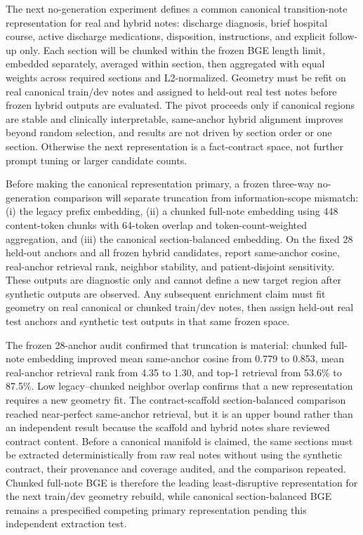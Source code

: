 \documentclass[11pt]{article}
\begin{document}
The next no-generation experiment defines a common canonical transition-note representation for real and hybrid notes: discharge diagnosis, brief hospital course, active discharge medications, disposition, instructions, and explicit follow-up only.  Each section will be chunked within the frozen BGE length limit, embedded separately, averaged within section, then aggregated with equal weights across required sections and L2-normalized.  Geometry must be refit on real canonical train/dev notes and assigned to held-out real test notes before frozen hybrid outputs are evaluated.  The pivot proceeds only if canonical regions are stable and clinically interpretable, same-anchor hybrid alignment improves beyond random selection, and results are not driven by section order or one section.  Otherwise the next representation is a fact-contract space, not further prompt tuning or larger candidate counts.

Before making the canonical representation primary, a frozen three-way no-generation comparison will separate truncation from information-scope mismatch: (i) the legacy prefix embedding, (ii) a chunked full-note embedding using 448 content-token chunks with 64-token overlap and token-count-weighted aggregation, and (iii) the canonical section-balanced embedding.  On the fixed 28 held-out anchors and all frozen hybrid candidates, report same-anchor cosine, real-anchor retrieval rank, neighbor stability, and patient-disjoint sensitivity.  These outputs are diagnostic only and cannot define a new target region after synthetic outputs are observed.  Any subsequent enrichment claim must fit geometry on real canonical or chunked train/dev notes, then assign held-out real test anchors and synthetic test outputs in that same frozen space.

The frozen 28-anchor audit confirmed that truncation is material: chunked full-note embedding improved mean same-anchor cosine from 0.779 to 0.853, mean real-anchor retrieval rank from 4.35 to 1.30, and top-1 retrieval from 53.6\% to 87.5\%.  Low legacy--chunked neighbor overlap confirms that a new representation requires a new geometry fit.  The contract-scaffold section-balanced comparison reached near-perfect same-anchor retrieval, but it is an upper bound rather than an independent result because the scaffold and hybrid notes share reviewed contract content.  Before a canonical manifold is claimed, the same sections must be extracted deterministically from raw real notes without using the synthetic contract, their provenance and coverage audited, and the comparison repeated.  Chunked full-note BGE is therefore the leading least-disruptive representation for the next train/dev geometry rebuild, while canonical section-balanced BGE remains a prespecified competing primary representation pending this independent extraction test.
\end{document}
